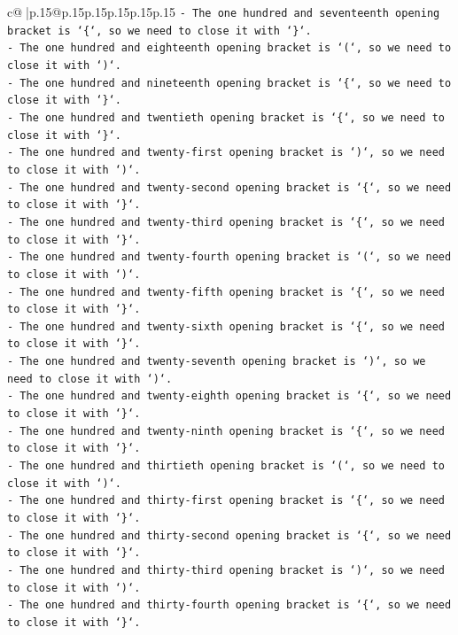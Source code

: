 \documentclass{article}
\begin{document}
{\begin{supertabular}{c@{$\;$}|p{.15\linewidth}@{}p{.15\linewidth}p{.15\linewidth}p{.15\linewidth}p{.15\linewidth}p{.15\linewidth}}
{{{\texttt{{-} The one hundred and seventeenth opening bracket is `\{`, so we need to close it with `\}`.} \\
\texttt{{-} The one hundred and eighteenth opening bracket is `(`, so we need to close it with `)`.} \\
\texttt{{-} The one hundred and nineteenth opening bracket is `\{`, so we need to close it with `\}`.} \\
\texttt{{-} The one hundred and twentieth opening bracket is `\{`, so we need to close it with `\}`.} \\
\texttt{{-} The one hundred and twenty{-}first opening bracket is `)`, so we need to close it with `)`.} \\
\texttt{{-} The one hundred and twenty{-}second opening bracket is `\{`, so we need to close it with `\}`.} \\
\texttt{{-} The one hundred and twenty{-}third opening bracket is `\{`, so we need to close it with `\}`.} \\
\texttt{{-} The one hundred and twenty{-}fourth opening bracket is `(`, so we need to close it with `)`.} \\
\texttt{{-} The one hundred and twenty{-}fifth opening bracket is `\{`, so we need to close it with `\}`.} \\
\texttt{{-} The one hundred and twenty{-}sixth opening bracket is `\{`, so we need to close it with `\}`.} \\
\texttt{{-} The one hundred and twenty{-}seventh opening bracket is `)`, so we need to close it with `)`.} \\
\texttt{{-} The one hundred and twenty{-}eighth opening bracket is `\{`, so we need to close it with `\}`.} \\
\texttt{{-} The one hundred and twenty{-}ninth opening bracket is `\{`, so we need to close it with `\}`.} \\
\texttt{{-} The one hundred and thirtieth opening bracket is `(`, so we need to close it with `)`.} \\
\texttt{{-} The one hundred and thirty{-}first opening bracket is `\{`, so we need to close it with `\}`.} \\
\texttt{{-} The one hundred and thirty{-}second opening bracket is `\{`, so we need to close it with `\}`.} \\
\texttt{{-} The one hundred and thirty{-}third opening bracket is `)`, so we need to close it with `)`.} \\
\texttt{{-} The one hundred and thirty{-}fourth opening bracket is `\{`, so we need to close it with `\}`.} \\
}}}
\end{supertabular}}
\end{document}
